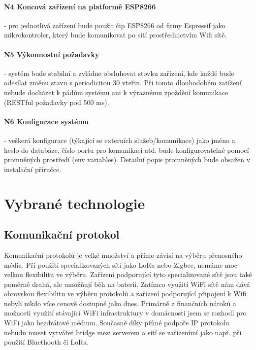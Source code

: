 \paragraph{N4 Koncová zařízení na platformě ESP8266}
- pro jednotlivá zařízení bude použit čip ESP8266 od firmy Espressif jako mikrokontroler, který bude komunikovat po sítí prostřednictvím Wifi sítě.

\paragraph{N5 Výkonnostní požadavky}
- systém bude stabilní a zvládne obsluhovat stovku zařízení, kde každé bude odesílat změnu stavu s periodicitou 30 vteřin. Při tomto dlouhodobém zatížení nebude docházet k pádům systému ani k výraznému zpoždění komunikace (RESTful požadavky pod 500 ms).

\paragraph{N6 Konfigurace systému} %
- veškerá konfigurace (týkající se externích služeb/komunikace) jako jméno a heslo do databáze, číslo portu pro komunikaci atd. bude konfigurovatelné pomocí promněných prostředí (env variables). Detailní popis promněných bude obsažen v instalační příručce.

\section{Vybrané technologie}

\subsection{Komunikační protokol}   %
Komunikační protokolů je velké množství a přímo závisí na výběru přenosného média. Při použití specializovaných sítí jako LoRa nebo Zigbee, nemáme moc velkou flexibilitu ve výběru. Zařízení podporující tyto specializované sítě jsou také poměrně drahá, ale umožňují běh na baterii. Zatímco využití WiFi sítě nám dává obrovskou flexibilitu ve výběru protokolů a zařízení podporující připojení k Wifi nebyli nikdo více cenově dostupné jako dnes. Primárně z finančních nároků a možnosti využití stávající WiFi infrastruktury v domácnosti jsem se rozhodl pro WiFi jako bezdrátové médium. Současně díky přímé podpoře IP protokolu nebudu muset vytvářet bridge mezi serverem a sítí se zařízenímí jako např. při použití Bluethooth či LoRa.

